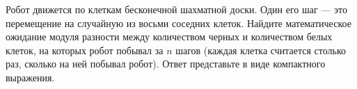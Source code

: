 \documentclass{article}
\begin{document}
Робот движется по клеткам бесконечной шахматной доски. Один его шаг --- это перемещение на случайную из восьми соседних клеток.
Найдите математическое ожидание модуля разности между количеством черных и количеством белых клеток, на которых робот побывал за $n$ шагов (каждая клетка считается столько раз, сколько на ней побывал робот). Ответ представьте в виде компактного выражения.
\end{document}

